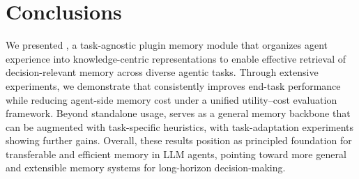 \section{Conclusions}
We presented \plugmem, a task-agnostic plugin memory module that organizes agent experience into knowledge-centric representations to enable effective retrieval of decision-relevant memory across diverse agentic tasks. 
Through extensive experiments, we demonstrate that \plugmem consistently improves end-task performance while reducing agent-side memory cost under a unified utility–cost evaluation framework.
Beyond standalone usage, \plugmem serves as a general memory backbone that can be augmented with task-specific heuristics, with task-adaptation experiments showing further gains.
Overall, these results position \plugmem as principled foundation for transferable and efficient memory in LLM agents, pointing toward more general and extensible memory systems for long-horizon decision-making.